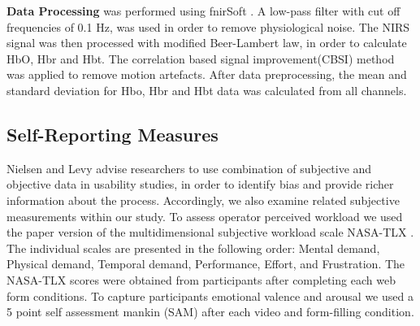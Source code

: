 \documentclass[../main/Feedback.tex]{subfiles}
\begin{document}
\textbf{Data Processing} was performed using fnirSoft \cite{ayazfunctional}. 
A low-pass filter with cut off frequencies of 0.1 Hz, was used in order to remove physiological noise.
The NIRS signal was then processed with modified Beer-Lambert law\cite{cope1988system}, in order to calculate HbO, Hbr and Hbt.  
The correlation based signal improvement(CBSI) \cite{cui2010functional} method was applied to remove motion artefacts.
After data preprocessing, the mean and standard deviation for Hbo, Hbr and Hbt data was calculated from all channels.


\subsection{Self-Reporting Measures}
Nielsen and Levy \cite{nielsen1994measuring} advise researchers to use combination of subjective and objective data in usability studies, in order to identify bias and provide richer information about the process. Accordingly, we also examine related subjective measurements within our study. To assess operator perceived workload we used the paper version of the multidimensional subjective workload scale NASA-TLX \cite{nasatlx}.
The individual scales are presented in the following order: Mental demand, Physical demand, Temporal demand, Performance, Effort, and Frustration.
The NASA-TLX scores were obtained from participants after completing each web form conditions. To capture participants emotional valence and arousal we used a 5 point self assessment mankin (SAM)\cite{bradley1994measuring} after each video and form-filling condition.  
\end{document}
